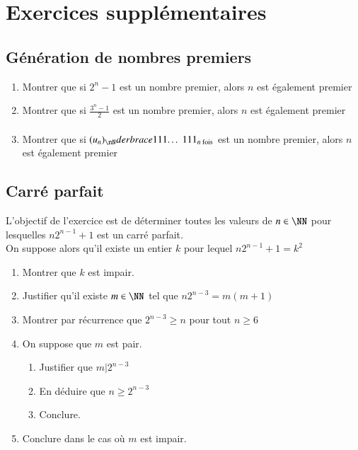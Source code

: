 \documentclass[oneside,12pt]{article}          %
\begin{document}
\section{Exercices supplémentaires}

\subsection{Génération de nombres premiers}

\begin{enumerate}
    \item Montrer que si $2^n-1$ est un nombre premier, alors $n$ est également premier
    \item Montrer que si $\frac{3^n-1}{2}$ est un nombre premier, alors $n$ est également premier
    \item Montrer que si $(u_n)_{\nN}derbrace{111\ldots111}_{n \text{ fois}}$ est un nombre premier, alors $n$ est également premier
\end{enumerate}



\subsection{Carré parfait}
L'objectif de l'exercice est de déterminer toutes les valeurs de $n\in\NN$ pour lesquelles $n2^{n-1}+1$ est un carré parfait.\\
On suppose alors qu'il existe un entier $k$ pour lequel $n2^{n-1}+1=k^2$
\begin{enumerate}
	\item Montrer que $k$ est impair.
	\item Justifier qu'il existe $m\in\NN$ tel que $n2^{n-3}=m(m+1)$
	\item Montrer par récurrence que $2^{n-3}\geq n$ pour tout $n\geq6$
	\item On suppose que $m$ est pair.
	\begin{enumerate}
		\item Justifier que $m\vert2^{n-3}$
		\item En déduire que $n\geq2^{n-3}$
		\item Conclure.
	\end{enumerate}
	\item Conclure dans le cas où $m$ est impair.
\end{enumerate}
\end{document}

